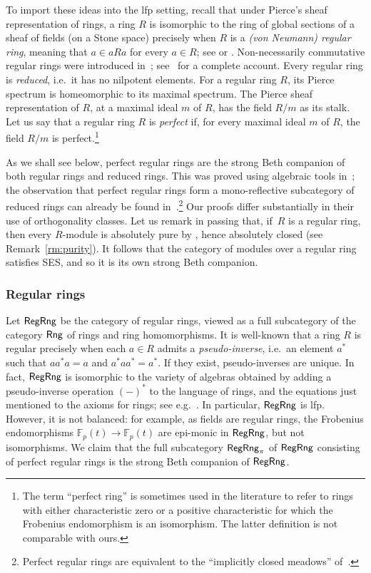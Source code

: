 \documentclass[a4paper,10pt,reqno]{amsart}
\theoremstyle{definition}
\theoremstyle{remark}
\newcommand{\Rng}{{\sf Rng}}								%
\newcommand{\RegRng}{{\sf RegRng}}						%
\newcommand{\SES}{\textnormal{SES}}
\begin{document}
To import these ideas into the lfp setting, recall that under Pierce's sheaf representation of rings, a ring $R$ is isomorphic to the ring of global sections of a sheaf of fields (on a Stone space) precisely when $R$ is a \emph{(von Neumann) regular ring}, meaning that $a\in aRa$ for every $a\in R$; see \cite[Theorem~10.3]{Pierce1967} or \cite[Proposition~V.2.6]{Johnstone1982}. Non-necessarily commutative regular rings were introduced in~\cite{vonNeumann1936}; see~\cite{Goodearl1991} for a complete account. Every regular ring is \emph{reduced}, i.e.\ it has no nilpotent elements. 
%
For a regular ring $R$, its Pierce spectrum is homeomorphic to its maximal spectrum. The Pierce sheaf representation of $R$, at a maximal ideal $m$ of $R$, has the field $R/m$ as its stalk. Let us say that a regular ring $R$ is \emph{perfect} if, for every maximal ideal $m$ of $R$, the field $R/m$ is perfect.\footnote{The term ``perfect ring'' is sometimes used in the literature to refer to rings with either characteristic zero or a positive characteristic for which the Frobenius endomorphism is an isomorphism. The latter definition is not comparable with ours.} 

As we shall see below, perfect regular rings are the strong Beth companion of both regular rings and reduced rings. This was proved using algebraic tools in~\cite{CKM2026rings}; the observation that perfect regular rings form a mono-reflective subcategory of reduced rings can already be found in~\cite{BKR2015}.\footnote{Perfect regular rings are equivalent to the ``implicitly closed meadows'' of~\cite{CKM2026rings}.} Our proofs differ substantially in their use of orthogonality classes.
%
Let us remark in passing that, if~$R$ is a regular ring, then every $R$-module is absolutely pure by \cite[Theorem~5]{Megibben1970}, hence absolutely closed (see Remark~\ref{rm:purity}). It follows that the category of modules over a regular ring satisfies \SES, and so it is its own strong Beth companion.


\subsubsection*{Regular rings}
%
Let $\RegRng$ be the category of regular rings, viewed as a full subcategory of the category $\Rng$ of rings and ring homomorphisms. It is well-known that a ring $R$ is regular precisely when each $a\in R$ admits a \emph{pseudo-inverse}, i.e.\ an element $a^{*}$ such that $a a^{*} a = a$ and $a^{*} a a^{*} = a^{*}$. If they exist, pseudo-inverses are unique. In fact, $\RegRng$ is isomorphic to the variety of algebras obtained by adding a pseudo-inverse operation $(-)^{*}$ to the language of rings, and the equations just mentioned to the axioms for rings; see e.g.\ \cite[pp.~428--429]{Cornish1977}. In particular, $\RegRng$ is lfp. However, it is not balanced: for example, as fields are regular rings, the Frobenius endomorphisms $\mathbb{F}_{p}(t) \to \mathbb{F}_{p}(t)$ are epi-monic in $\RegRng$, but not isomorphisms.
%
We claim that the full subcategory $\RegRng_{\pi}$ of $\RegRng$ consisting of perfect regular rings is the strong Beth companion of $\RegRng$. 
\end{document}
